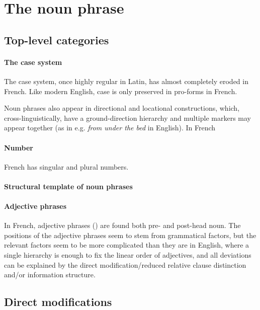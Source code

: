 \documentclass[a4paper, oneside, 12pt]{report}
\newcommand{\form}[1]{\emph{#1}}
\begin{document}
\section{The noun phrase}

\subsection{Top-level categories}

\paragraph*{The case system}\label{sec:grammatical.np.peripheral.case}
The case system, once highly regular in Latin, has almost completely eroded in French.
Like modern English, case is only preserved in pro-forms in French.

Noun phrases also appear in directional and locational constructions,
which, cross-linguistically, have a ground-direction hierarchy and multiple markers may appear together
(as in e.g. \form{from under the bed} in English).
In French 

\paragraph*{Number} French has singular and plural numbers.

\paragraph*{Structural template of noun phrases}

\paragraph*{Adjective phrases}
In French, adjective phrases () are found both pre- and post-head noun.
The positions of the adjective phrases seem to stem from grammatical factors,
but the relevant factors seem to be more complicated than they are in English,
where a single hierarchy is enough to fix the linear order of adjectives,
and all deviations can be explained by the direct modification/reduced relative clause distinction
and/or information structure.

\subsection{Direct modifications}\label{sec:grammatical.np.direct-modify}
\end{document}
